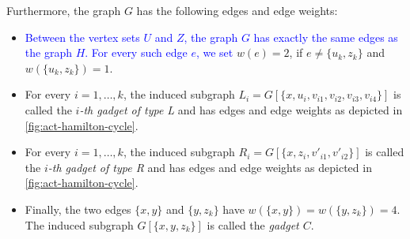 \documentclass[runningheads]{llncs}
\newcommand{\set}[1]{\{ #1 \}}
\newcommand{\lasse}[1]{\textcolor{blue}{#1}}
\begin{document}
Furthermore, the graph $G$ has the following edges and edge weights:
\begin{itemize}
\item \lasse{Between the vertex sets $U$ and $Z$, the graph $G$ has exactly the same edges as the graph $H$. 
For every such edge $e$, we set} $w(e) = 2$, if $e \neq \set{u_k, z_k}$ and $w(\set{u_k, z_k}) = 1$.
\item For every $i = 1,\dots,k$, the induced subgraph $L_i = G[\set{x, u_i, v_{i1}, v_{i2}, v_{i3}, v_{i4}}]$ 
is called the \emph{$i$-th gadget of type L} and has edges and edge weights as depicted in \cref{fig:act-hamilton-cycle}.
\item For every $i = 1,\dots,k$, the induced subgraph $R_i = G[\set{x, z_i, v'_{i1}, v'_{i2}}]$ is called the 
\emph{$i$-th gadget of type R} and has edges and edge weights as depicted in \cref{fig:act-hamilton-cycle}.
\item Finally, the two edges $\set{x,y}$ and $\set{y, z_k}$ have $w(\set{x,y}) = w(\set{y, z_k}) = 4$. The induced subgraph $G[\set{x,y,z_k}]$ is called the \emph{gadget $C$}.
\end{itemize}
\end{document}
